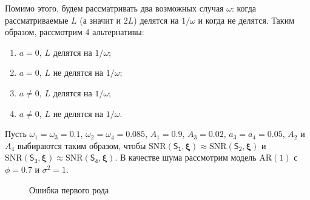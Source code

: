 \documentclass[specialist,
substylefile = spbu_report.rtx,
subf,href,colorlinks=true, 12pt]{disser}
\theoremstyle{definition}
\begin{document}
Помимо этого, будем рассматривать два возможных случая $\omega$: когда рассматриваемые $L$ (а значит и $2L$) делятся на $1/\omega$ и когда не делятся. Таким образом, рассмотрим 4 альтернативы:
\begin{enumerate}
	\item $a=0$, $L$ делятся на $1/\omega$;
	\item $a=0$, $L$ не делятся на $1/\omega$;
	\item $a\ne0$, $L$ делятся на $1/\omega$;
	\item  $a\ne0$, $L$ не делятся на $1/\omega$.
\end{enumerate}

Пусть $\omega_1=\omega_3=0.1$, $\omega_2=\omega_4=0.085$, $A_1=0.9$, $A_3=0.02$, $a_3=a_4=0.05$, $A_2$ и $A_4$ выбираются таким образом, чтобы $\mathrm{SNR}(\mathsf{S_1}, \boldsymbol\xi)\approx\mathrm{SNR}(\mathsf{S_2}, \boldsymbol\xi)$ и $\mathrm{SNR}(\mathsf{S_3}, \boldsymbol\xi)\approx\mathrm{SNR}(\mathsf{S_4}, \boldsymbol\xi)$. В качестве шума рассмотрим модель AR$(1)$ с $\phi=0.7$ и $\sigma^2=1$.

\begin{figure}[h!]
	\centering
	\hfill
	\par 
	\caption{Ошибка первого рода}
	\label{fig:mcssa_comp_alphaI}
\end{figure}
\end{document}
